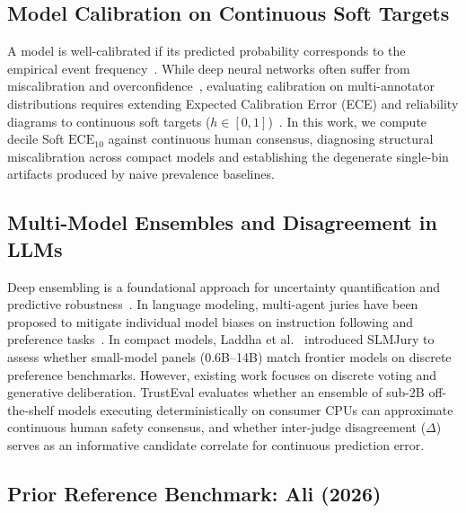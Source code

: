 \subsection{Model Calibration on Continuous Soft Targets}
\label{sec:rel_calibration}

A model is well-calibrated if its predicted probability corresponds to the empirical event frequency~\cite{brier1950verification}. While deep neural networks often suffer from miscalibration and overconfidence~\cite{guo2017calibration}, evaluating calibration on multi-annotator distributions requires extending Expected Calibration Error (ECE) and reliability diagrams to continuous soft targets ($h \in [0, 1]$)~\cite{ovadia2019can}. In this work, we compute decile Soft $\text{ECE}_{10}$ against continuous human consensus, diagnosing structural miscalibration across compact models and establishing the degenerate single-bin artifacts produced by naive prevalence baselines.

\subsection{Multi-Model Ensembles and Disagreement in LLMs}
\label{sec:rel_ensembles}

Deep ensembling is a foundational approach for uncertainty quantification and predictive robustness~\cite{lakshminarayanan2017simple}. In language modeling, multi-agent juries have been proposed to mitigate individual model biases on instruction following and preference tasks~\cite{verga2024replacing,qian2026who,li2026calibrate,feng2026noisy,zhang2026can}. In compact models, Laddha et al.~\cite{laddha2026slmjury} introduced SLMJury to assess whether small-model panels (0.6B--14B) match frontier models on discrete preference benchmarks. However, existing work focuses on discrete voting and generative deliberation. TrustEval evaluates whether an ensemble of sub-2B off-the-shelf models executing deterministically on consumer CPUs can approximate continuous human safety consensus, and whether inter-judge disagreement ($\Delta$) serves as an informative candidate correlate for continuous prediction error.

\subsection{Prior Reference Benchmark: Ali (2026)}
\label{sec:rel_prior_benchmark}

